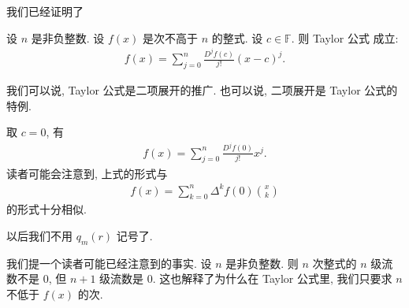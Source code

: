 我们已经证明了

\begin{proposition}
    设 $n$ 是非负整数. 设 $f(x)$ 是次不高于 $n$ 的整式. 设 $c \in \mathbb{F}$. 则 Taylor 公式  成立:
    \begin{align*}
        f(x) = \sum_{j = 0}^{n} \frac{D^j f(c)}{j!} (x-c)^j.
    \end{align*}
\end{proposition}

\begin{remark}
    我们可以说, Taylor 公式是二项展开的推广. 也可以说, 二项展开是 Taylor 公式的特例.
\end{remark}

\begin{remark}
    取 $c = 0$, 有
    \begin{align*}
        f(x) = \sum_{j = 0}^{n} \frac{D^j f(0)}{j!} x^j.
    \end{align*}
    读者可能会注意到, 上式的形式与
    \begin{align*}
        f(x) = \sum_{k = 0}^{n} \Delta^k f(0) \binom{x}{k}
    \end{align*}
    的形式十分相似.
\end{remark}

\begin{remark}
    以后我们不用 $q_m (r)$ 记号了.
\end{remark}

\begin{remark}
    我们提一个读者可能已经注意到的事实. 设 $n$ 是非负整数. 则 $n$ 次整式的 $n$ 级流数不是 $0$, 但 $n+1$ 级流数是 $0$. 这也解释了为什么在 Taylor 公式里, 我们只要求 $n$ 不低于 $f(x)$ 的次.
\end{remark}

